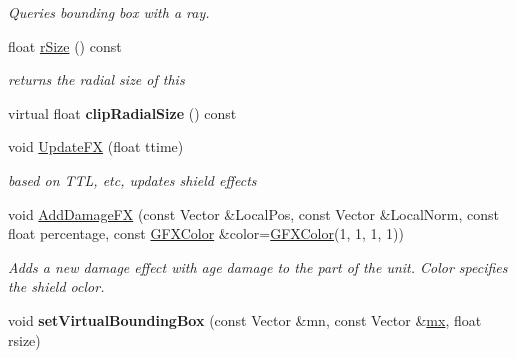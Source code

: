 \begin{DoxyCompactItemize}
\begin{DoxyCompactList}\small\item\em Queries bounding box with a ray. \end{DoxyCompactList}\item 
float \hyperlink{classMesh_a3381b5fa09794ad27c5824ca8b8a5710}{r\+Size} () const \hypertarget{classMesh_a3381b5fa09794ad27c5824ca8b8a5710}{}\label{classMesh_a3381b5fa09794ad27c5824ca8b8a5710}

\begin{DoxyCompactList}\small\item\em returns the radial size of this \end{DoxyCompactList}\item 
virtual float {\bfseries clip\+Radial\+Size} () const \hypertarget{classMesh_ada628205e87ad355680b168462f67531}{}\label{classMesh_ada628205e87ad355680b168462f67531}

\item 
void \hyperlink{classMesh_a685c5329473310eda6375fa487ddf1ef}{Update\+FX} (float ttime)\hypertarget{classMesh_a685c5329473310eda6375fa487ddf1ef}{}\label{classMesh_a685c5329473310eda6375fa487ddf1ef}

\begin{DoxyCompactList}\small\item\em based on T\+TL, etc, updates shield effects \end{DoxyCompactList}\item 
void \hyperlink{classMesh_a5895e14f3b6381b887c741c92f8b6476}{Add\+Damage\+FX} (const Vector \&Local\+Pos, const Vector \&Local\+Norm, const float percentage, const \hyperlink{structGFXColor}{G\+F\+X\+Color} \&color=\hyperlink{structGFXColor}{G\+F\+X\+Color}(1, 1, 1, 1))\hypertarget{classMesh_a5895e14f3b6381b887c741c92f8b6476}{}\label{classMesh_a5895e14f3b6381b887c741c92f8b6476}

\begin{DoxyCompactList}\small\item\em Adds a new damage effect with age damage to the part of the unit. Color specifies the shield oclor. \end{DoxyCompactList}\item 
void {\bfseries set\+Virtual\+Bounding\+Box} (const Vector \&mn, const Vector \&\hyperlink{classMesh_a2732fc31d4d22180fa07d2c19b72b83d}{mx}, float rsize)\hypertarget{classMesh_aa811dca14faab4549cb017e8ee2f7f26}{}\label{classMesh_aa811dca14faab4549cb017e8ee2f7f26}

\end{DoxyCompactItemize}
